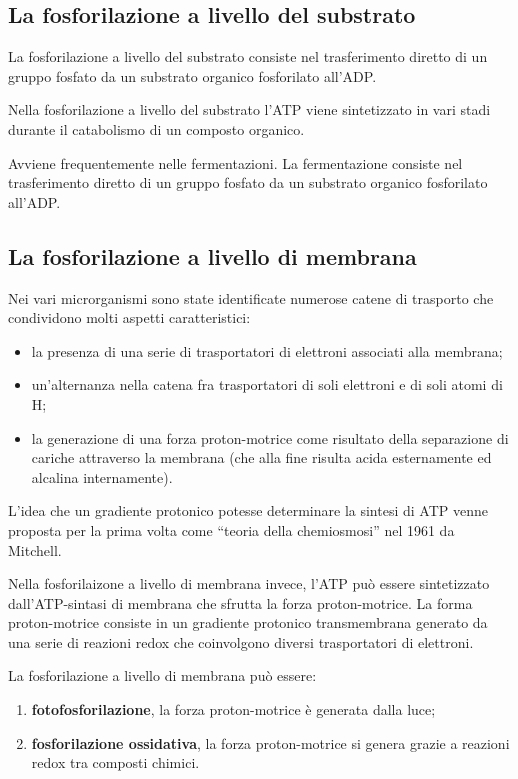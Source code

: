 \documentclass[11pt]{book}
\begin{document}
\subsection{La fosforilazione a livello del substrato}
La fosforilazione a livello del substrato consiste nel trasferimento diretto di un gruppo fosfato da un substrato organico fosforilato all’ADP.

Nella fosforilazione a livello del substrato l’ATP viene sintetizzato in vari stadi durante il catabolismo di un composto organico.

Avviene frequentemente nelle fermentazioni.
La fermentazione consiste nel trasferimento diretto di un gruppo fosfato da un substrato organico fosforilato all’ADP.

\subsection{La fosforilazione a livello di membrana}
Nei vari microrganismi sono state identificate numerose catene di trasporto che condividono molti aspetti caratteristici:
\begin{itemize}
\item la presenza di una serie di trasportatori di elettroni associati alla membrana;
\item un'alternanza nella catena fra trasportatori di soli elettroni e di soli atomi di H;
\item la generazione di una forza proton-motrice come risultato della separazione di cariche attraverso la membrana (che alla fine risulta acida esternamente ed alcalina internamente).
\end{itemize}

L’idea che un gradiente protonico potesse determinare la sintesi di ATP venne proposta per la prima volta come ``teoria della chemiosmosi'' nel 1961 da Mitchell.

Nella fosforilaizone a livello di membrana invece, l'ATP può essere sintetizzato dall’ATP-sintasi di membrana che sfrutta la forza proton-motrice. La forma proton-motrice consiste in un gradiente protonico transmembrana generato da una serie di reazioni redox che coinvolgono diversi trasportatori di elettroni.

La fosforilazione a livello di membrana può essere:
\begin{enumerate}
\item \textbf{fotofosforilazione}, la forza proton-motrice è generata dalla luce;
\item \textbf{fosforilazione ossidativa}, la forza proton-motrice si genera grazie a reazioni redox tra composti chimici.
\end{enumerate}
\end{document}
